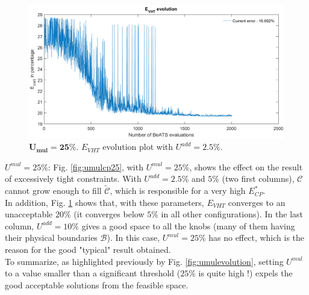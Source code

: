 \begin{figure}[!h]
	\centering
	\caption{$\mathbf{U_{mul}=25\%}$. $E_{VHT}$ evolution plot with $U^{add}=2.5\% $.}
	\label{fig:badvht}
	\includegraphics[width=7in]{figures/results_figures/Umul/bad_vht.png}
\end{figure}		
\newpage
\emph{$U^{mul}=25\% $}: Fig. \ref{fig:umulcp25}, with $U^{mul}=25\% $, shows the effect on the result of excessively tight constraints.  With $U^{add}=2.5\% $ and $5\% $ (two first columns), $\mathscr{C}$ cannot grow enough to fill $\widetilde{\mathscr{C}}$, which is responsible for a very high $E_{CP}^{*}$.\\
In addition, Fig. \ref{fig:badvht} shows that, with these parameters, $E_{VHT}$ converges to an unacceptable $20\% $ (it converges below $5 \% $ in all other configurations).
In the last column, $U^{add}=10\% $ gives a good space to all the knobs (many of them having their physical boundaries $\mathscr{B}$). In this case, $U^{mul}=25\% $ has no effect, which is the reason for the good "typical" result obtained.\\
To summarize, as highlighted previously by Fig. \ref{fig:umulevolution}, setting $U^{mul}$ to a value smaller than a significant threshold ($25\% $ is quite high !) expels the good acceptable solutions from the feasible space.\\

